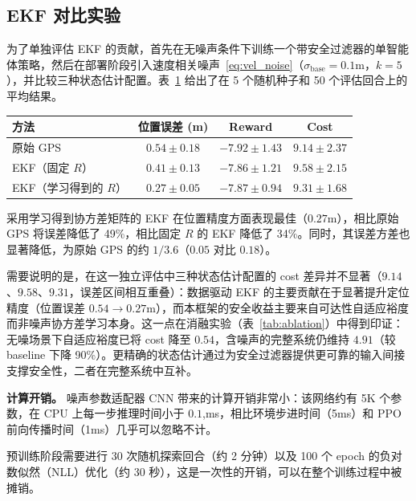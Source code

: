 \subsection{EKF 对比实验}
为了单独评估 EKF 的贡献，首先在无噪声条件下训练一个带安全过滤器的单智能体策略，然后在部署阶段引入速度相关噪声~\eqref{eq:vel_noise}（$\sigma_{\text{base}} = 0.1$m，$k = 5$），并比较三种状态估计配置。表~\ref{tab:ekf_comparison} 给出了在 5 个随机种子和 50 个评估回合上的平均结果。

\begin{table}[t]
\centering
{}
\label{tab:ekf_comparison}
\setlength{\tabcolsep}{11pt}%
\begin{tabular}{@{}l|ccc@{}}
\toprule
方法 & 位置误差 (m) & Reward & Cost \\
\midrule
原始 GPS & $0.54 {\pm} 0.18$ & $-7.92 {\pm} 1.43$ & $9.14 {\pm} 2.37$ \\
EKF（固定 $R$） & $0.41 {\pm} 0.13$ & $-7.86 {\pm} 1.21$ & $9.58 {\pm} 2.15$ \\
EKF（学习得到的 $R$） & $\mathbf{0.27 {\pm} 0.05}$ & $-7.87 {\pm} 0.94$ & $9.31 {\pm} 1.68$ \\
\bottomrule
\end{tabular}
\end{table}

采用学习得到协方差矩阵的 EKF 在位置精度方面表现最佳（$0.27$m），相比原始 GPS 将误差降低了 49\%，相比固定 $R$ 的 EKF 降低了 34\%。同时，其误差方差也显著降低，为原始 GPS 的约 $1/3.6$（$0.05$ 对比 $0.18$）。

需要说明的是，在这一独立评估中三种状态估计配置的 cost 差异并不显著（$9.14$、$9.58$、$9.31$，误差区间相互重叠）：数据驱动 EKF 的主要贡献在于显著提升定位精度（位置误差 $0.54 \rightarrow 0.27$m），而本框架的安全收益主要来自可达性自适应裕度而非噪声协方差学习本身。这一点在消融实验（表~\ref{tab:ablation}）中得到印证：无噪场景下自适应裕度已将 cost 降至 $0.54$，含噪声的完整系统仍维持 $4.91$（较 baseline 下降 90\%）。更精确的状态估计通过为安全过滤器提供更可靠的输入间接支撑安全性，二者在完整系统中互补。

\textbf{计算开销。} 噪声参数适配器 CNN 带来的计算开销非常小：该网络约有 5K 个参数，在 CPU 上每一步推理时间小于 $0.1$,ms，相比环境步进时间（5ms）和 PPO 前向传播时间（1ms）几乎可以忽略不计。

预训练阶段需要进行 30 次随机探索回合（约 2 分钟）以及 100 个 epoch 的负对数似然（NLL）优化（约 30 秒），这是一次性的开销，可以在整个训练过程中被摊销。

